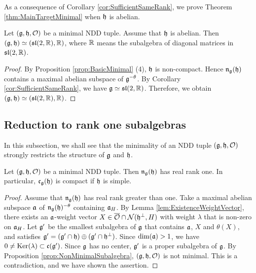 As a consequence of Corollary \ref{cor:SufficientSameRank}, we prove Theorem \ref{thm:MainTargetMinimal} when $\mathfrak{h}$ is abelian.

\begin{theorem} \label{thm:MinimalAbelian}
	Let $(\mathfrak{g}, \mathfrak{h}, \mathcal{O})$ be a minimal NDD tuple.
	Assume that $\mathfrak{h}$ is abelian.
	Then $(\mathfrak{g}, \mathfrak{h}) \simeq (\mathfrak{sl}(2,\mathbb{R}), \mathbb{R})$, where $\mathbb{R}$ means the subalgebra of diagonal matrices in $\mathfrak{sl}(2,\mathbb{R})$.
\end{theorem}

\begin{proof}
	By Proposition \ref{prop:BasicMinimal} (4), $\mathfrak{h}$ is non-compact.
	Hence $\mathfrak{n}_{\mathfrak{g}}(\mathfrak{h})$ contains a maximal abelian subspace of $\mathfrak{g}^{-\theta}$.
	By Corollary \ref{cor:SufficientSameRank}, we have $\mathfrak{g} \simeq \mathfrak{sl}(2,\mathbb{R})$.
	Therefore, we obtain $(\mathfrak{g}, \mathfrak{h}) \simeq (\mathfrak{sl}(2,\mathbb{R}), \mathbb{R})$.
\end{proof}

\subsection{Reduction to rank one subalgebras} \label{subsect:ReductionRankOne}

In this subsection, we shall see that the minimality of an NDD tuple $(\mathfrak{g}, \mathfrak{h}, \mathcal{O})$ strongly restricts the structure of $\mathfrak{g}$ and $\mathfrak{h}$.

\begin{lemma}
	Let $(\mathfrak{g}, \mathfrak{h}, \mathcal{O})$ be a minimal NDD tuple.
	Then $\mathfrak{n}_{\mathfrak{g}}(\mathfrak{h})$ has real rank one.
	In particular, $\mathfrak{c}_{\mathfrak{g}}(\mathfrak{h})$ is compact if $\mathfrak{h}$ is simple.
\end{lemma}

\begin{proof}
	Assume that $\mathfrak{n}_{\mathfrak{g}}(\mathfrak{h})$ has real rank greater than one.
	Take a maximal abelian subspace $\mathfrak{a}$ of $\mathfrak{n}_{\mathfrak{g}}(\mathfrak{h})^{-\theta}$ containing $\mathfrak{a}_H$.
	By Lemma \ref{lem:ExistenceWeightVector}, there exists an $\mathfrak{a}$-weight vector $X \in \overline{\mathcal{O}} \cap \mathcal{N}(\mathfrak{h}^\perp, H)$ with weight $\lambda$ that is non-zero on $\mathfrak{a}_H$.
	Let $\mathfrak{g'}$ be the smallest subalgebra of $\mathfrak{g}$ that contains $\mathfrak{a}$, $X$ and $\theta(X)$, and satisfies $\mathfrak{g'} = (\mathfrak{g'}\cap \mathfrak{h}) \oplus (\mathfrak{g'}\cap \mathfrak{h}^\perp)$.
	Since $\dim(\mathfrak{a}) > 1$, we have $0 \neq \mathrm{Ker}(\lambda) \subset \mathfrak{c}(\mathfrak{g'})$.
	Since $\mathfrak{g}$ has no center, $\mathfrak{g'}$ is a proper subalgebra of $\mathfrak{g}$.
	By Proposition \ref{prop:NonMinimalSubalgebra}, $(\mathfrak{g}, \mathfrak{h}, \mathcal{O})$ is not minimal.
	This is a contradiction, and we have shown the assertion.
\end{proof}

